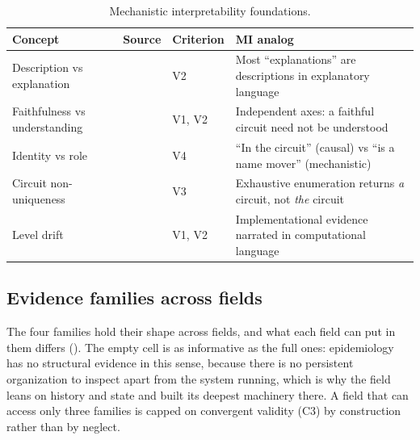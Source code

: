 \documentclass{article}
\begin{document}
\begin{table}[H]
\centering\small
\caption{Mechanistic interpretability foundations.}
\renewcommand{\arraystretch}{1.12}
\begin{tabular}{@{}l>{\raggedright\arraybackslash}p{2.2cm}l>{\raggedright\arraybackslash}p{4.5cm}@{}}
\toprule
\textbf{Concept} & \textbf{Source} & \textbf{Criterion} & \textbf{MI analog} \\
\midrule
Description vs explanation & \citet{olsson2022context} & V2 & Most ``explanations'' are descriptions in explanatory language \\
\midrule
Faithfulness vs understanding & \citet{wang2023interpretability} & V1, V2 & Independent axes: a faithful circuit need not be understood \\
\midrule
Identity vs role & \citet{wang2023interpretability} & V4 & ``In the circuit'' (causal) vs ``is a name mover'' (mechanistic) \\
\midrule
Circuit non-uniqueness & \citet{meloux2025everything} & V3 & Exhaustive enumeration returns \emph{a} circuit, not \emph{the} circuit \\
\midrule
Level drift & \citet{marr1982vision} & V1, V2 & Implementational evidence narrated in computational language \\
\bottomrule
\end{tabular}
\end{table}

\subsection{Evidence families across fields}
\label{app:families-domains}

The four families hold their shape across fields, and what each field can put in them differs (). The empty cell is as informative as the full ones: epidemiology has no structural evidence in this sense, because there is no persistent organization to inspect apart from the system running, which is why the field leans on history and state and built its deepest machinery there. A field that can access only three families is capped on convergent validity (C3) by construction rather than by neglect.
\end{document}
